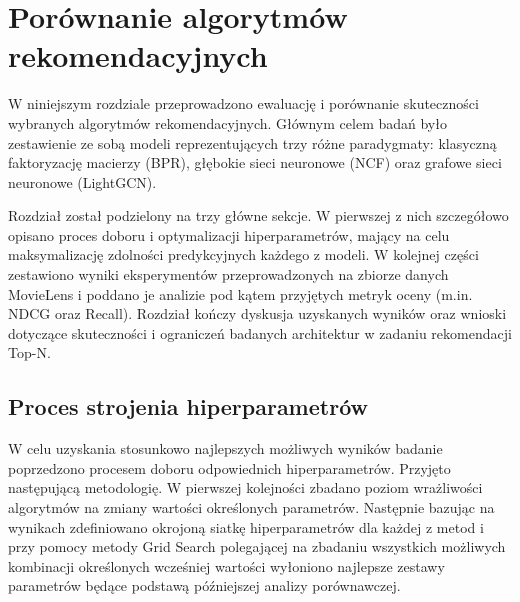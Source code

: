 \section{Porównanie algorytmów rekomendacyjnych}

W niniejszym rozdziale przeprowadzono ewaluację i porównanie skuteczności wybranych algorytmów rekomendacyjnych. Głównym celem badań było zestawienie ze sobą modeli reprezentujących trzy różne paradygmaty: klasyczną faktoryzację macierzy (BPR), głębokie sieci neuronowe (NCF) oraz grafowe sieci neuronowe (LightGCN).

Rozdział został podzielony na trzy główne sekcje. W pierwszej z nich szczegółowo opisano proces doboru i optymalizacji hiperparametrów, mający na celu maksymalizację zdolności predykcyjnych każdego z modeli. W kolejnej części zestawiono wyniki eksperymentów przeprowadzonych na zbiorze danych MovieLens i poddano je analizie pod kątem przyjętych metryk oceny (m.in. NDCG oraz Recall). Rozdział kończy dyskusja uzyskanych wyników oraz wnioski dotyczące skuteczności i ograniczeń badanych architektur w zadaniu rekomendacji Top-N.

\subsection{Proces strojenia hiperparametrów}

W celu uzyskania stosunkowo najlepszych możliwych wyników badanie poprzedzono procesem doboru odpowiednich hiperparametrów. Przyjęto następującą metodologię. W pierwszej kolejności zbadano poziom wrażliwości algorytmów na zmiany wartości określonych parametrów. Następnie bazując na wynikach zdefiniowano okrojoną siatkę hiperparametrów dla każdej z metod i przy pomocy metody Grid Search polegającej na zbadaniu wszystkich możliwych kombinacji określonych wcześniej wartości wyłoniono najlepsze zestawy parametrów będące podstawą późniejszej analizy porównawczej.

